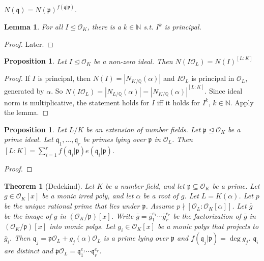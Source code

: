 \documentclass{article}
\theoremstyle{definition}
\theoremstyle{remark}
\theoremstyle{plain}
\newtheorem{lem}[defn]{Lemma}
\newtheorem{thm}[defn]{Theorem}
\newtheorem{prop}[defn]{Proposition}
\newcommand{\NN}{\mathbb{N}}
\newcommand{\QQ}{\mathbb{Q}}
\begin{document}
$N(\mathfrak q)=N(\mathfrak p)^{f(\mathfrak q|\mathfrak p)}$.

\begin{lem}
    For all $I\trianglelefteq \mathcal O_K$, there is a $k\in\NN$ s.t. $I^k$ is principal.
\end{lem}
\begin{proof}
    Later.
\end{proof}
\begin{prop}
    Let $I\trianglelefteq \mathcal O_K$ be a non-zero ideal. Then $N(I\mathcal O_L)=N(I)^{[L:K]}$
\end{prop}
\begin{proof}
    If $I$ is principal, then $N(I)=|N_{K/\QQ}(\alpha)|$ and $I\mathcal O_L$ is principal in $\mathcal O_L$, generated by $\alpha$. So $N(I\mathcal O_L)=|N_{L/\QQ}(\alpha)|=|N_{K/\QQ}(\alpha)|^{[L:K]}$. Since ideal norm is multiplicative, the statement holds for $I$ iff it holds for $I^k$, $k\in\NN$. Apply the lemma.
\end{proof}
\begin{prop}
    Let $L/K$ be an extension of number fields. Let $\mathfrak p\trianglelefteq \mathcal O_K$ be a prime  ideal. Let $\mathfrak q_1,...,\mathfrak q_r$ be primes lying over $\mathfrak p$ in $\mathcal O_L$. Then $[L:K]=\sum_{i=1}^r f(\mathfrak q_i|\mathfrak p)e(\mathfrak q_i|\mathfrak p)$.
\end{prop}
\begin{proof}
    
\end{proof}
\begin{thm}[Dedekind]
    Let $K$ be a number field, and let $\mathfrak p\subseteq \mathcal O_K$ be a prime. Let $g\in\mathcal O_K[x]$ be a monic irred poly, and let $\alpha$ be a root of $g$. Let $L=K(\alpha)$. Let $p$ be the unique rational prime that lies under $\mathfrak p$. Assume $p\nmid [\mathcal O_L:\mathcal O_K[\alpha]]$. Let $\bar g$ be the image of $g$ in $(\mathcal O_K/\mathfrak p)[x]$. Write $\bar g=\bar g_1^{e_1}\cdots \bar g_r^{e_r}$ be the factorization of $\bar g$ in $(\mathcal O_K/\mathfrak p)[x]$ into monic polys. Let $g_i\in\mathcal O_K[x]$ be a monic polys that projects to $\bar g_i$. Then $\mathfrak q_j=\mathfrak p\mathcal O_L+ g_j(\alpha)\mathcal O_L$ is a prime lying over $\mathfrak p$ and $f(\mathfrak q_j|\mathfrak p)=\deg g_j$. $\mathfrak q_i$ are distinct and $\mathfrak p\mathcal O_L=\mathfrak q_1^{e_1}\cdots\mathfrak q_r^{e_r}$.
\end{thm}
\end{document}
